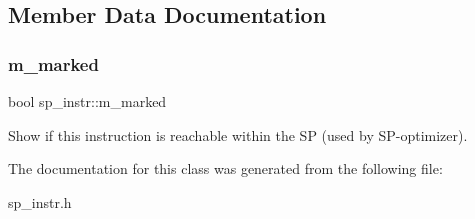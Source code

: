 \subsection{Member Data Documentation}
\mbox{\label{classsp__instr_a03665ad69f89c9ad7117228d54258e99}} 
\subsubsection{\texorpdfstring{m\+\_\+marked}{m\_marked}}
{\footnotesize\ttfamily bool sp\+\_\+instr\+::m\+\_\+marked\hspace{0.3cm}{\ttfamily [protected]}}

Show if this instruction is reachable within the SP (used by SP-\/optimizer). 

The documentation for this class was generated from the following file\+:\begin{DoxyCompactItemize}
\item 
sp\+\_\+instr.\+h\end{DoxyCompactItemize}
